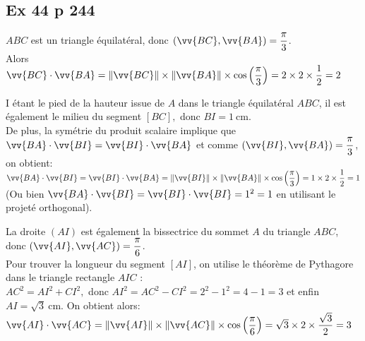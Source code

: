 \documentclass[12pt,a4paper]{book}
\begin{document}
\subsection*{Ex 44 p 244}
\begin{enumMet}
    \item $A B C$ est un triangle équilatéral, donc $(\vv{B C}, \vv{B A})=\dfrac{\pi}{3}$.\\
    Alors $\vv{B C} \cdot \vv{B A}=\|\vv{B C}\| \times\|\vv{B A}\| \times \cos \left(\dfrac{\pi}{3}\right)=2 \times 2 \times \dfrac{1}{2}=2$
    \item I étant le pied de la hauteur issue de $A$ dans le triangle équilatéral $A B C$, il est également le milieu du segment $[B C],$ donc $B I=1 \mathrm{~cm}$.\\
    De plus, la symétrie du produit scalaire implique que $\vv{B A} \cdot \vv{B I}=\vv{B I} \cdot \vv{B A}$ et comme $(\vv{B I}, \vv{B A})=\dfrac{\pi}{3}$, on obtient:\\
    $\vv{B A} \cdot \vv{B I}=\vv{B I} \cdot \vv{B A}=\|\vv{B I}\| \times\|\vv{B A}\| \times \cos \left(\dfrac{\pi}{3}\right)=1 \times 2 \times \dfrac{1}{2}=1$\\
    (Ou bien $\vv{B A} \cdot \vv{B I}=\vv{B I} \cdot \vv{B I}=1^{2}=1$ en utilisant le projeté orthogonal).
    \item La droite $(A I)$ est également la bissectrice du sommet $A$ du triangle $A B C$, donc $(\vv{A I}, \vv{A C})=\dfrac{\pi}{6}$.\\
    Pour trouver la longueur du segment $[A I]$, on utilise le théorème de Pythagore dans le triangle rectangle $A I C$ :\\
    $A C^{2}=A I^{2}+C I^{2},$ donc $A I^{2}=A C^{2}-C I^{2}=2^{2}-1^{2}=4-1=3$ et enfin
    $A I=\sqrt{3} \mathrm{~cm} .$ On obtient alors:\\
    $\vv{A I} \cdot \vv{A C}=\|\vv{A I}\| \times\|\vv{A C}\| \times \cos \left(\dfrac{\pi}{6}\right)=\sqrt{3} \times 2 \times \dfrac{\sqrt{3}}{2}=3$
\end{enumMet}

\end{document}
